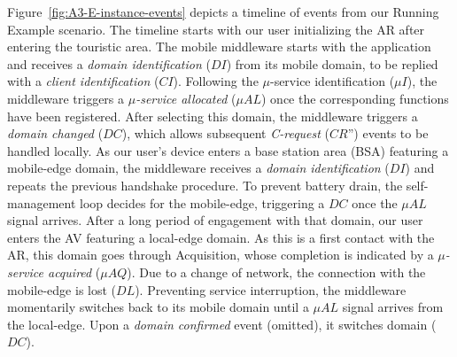 Figure~\ref{fig:A3-E-instance-events} depicts a timeline of events from our Running Example scenario. The timeline starts with our user initializing the AR after entering the touristic area. The mobile middleware starts with the application and receives a \textit{domain identification} ($DI$) from its mobile domain, to be replied with a \textit{client identification} ($CI$). Following the $\mu$-service identification ($\mu I$), the middleware triggers a \textit{$\mu$-service allocated} ($\mu AL$) once the corresponding functions have been registered. After selecting this domain, the middleware triggers a \textit{domain changed} ($DC$), which allows subsequent \textit{C-request} ($CR$'') events to be handled locally. As our user's device enters a base station area (BSA) featuring a mobile-edge domain, the middleware receives a \textit{domain identification} ($DI$) and repeats the previous handshake procedure. To prevent battery drain, the self-management loop decides for the mobile-edge, triggering a $DC$ once the $\mu AL$ signal arrives. After a long period of engagement with that domain, our user enters the AV featuring a local-edge domain. As this is a first contact with the AR, this domain goes through Acquisition, whose completion is indicated by a \textit{$\mu$-service acquired} ($\mu AQ$). Due to a change of network, the connection with the mobile-edge is lost ($DL$). Preventing service interruption, the middleware momentarily switches back to its mobile domain until a $\mu AL$ signal arrives from the local-edge. Upon a \textit{domain confirmed} event (omitted), it switches domain ($DC$). 

%
%
%		
%		
%		
%		
%		
%		

